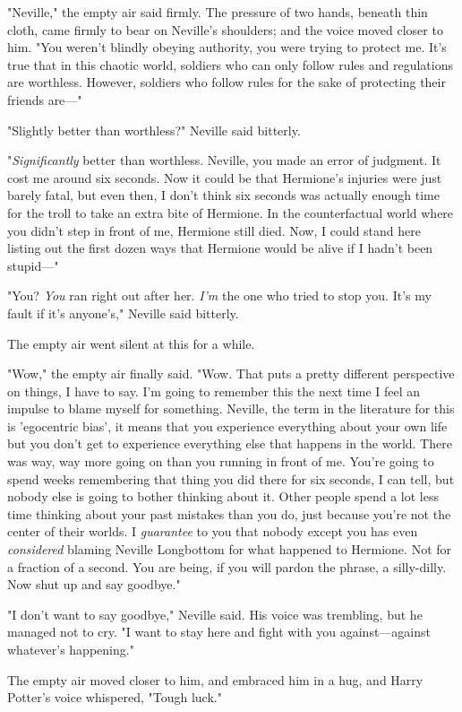 "Neville," the empty air said firmly. The pressure of two hands, beneath thin 
cloth, came firmly to bear on Neville's shoulders; and the voice moved closer 
to him. "You weren't blindly obeying authority, you were trying to protect me. 
It's true that in this chaotic world, soldiers who can only follow rules and 
regulations are worthless. However, soldiers who follow rules for the sake of 
protecting their friends are---"

"Slightly better than worthless?" Neville said bitterly.

"\emph{Significantly} better than worthless. Neville, you made an error of 
judgment. It cost me around six seconds. Now it could be that Hermione's 
injuries were just barely fatal, but even then, I don't think six seconds was 
actually enough time for the troll to take an extra bite of Hermione. In the 
counterfactual world where you didn't step in front of me, Hermione still died. 
Now, I could stand here listing out the first dozen ways that Hermione would be 
alive if I hadn't been stupid---"

"You? \emph{You} ran right out after her. \emph{I'm} the one who tried to stop 
you. It's my fault if it's anyone's," Neville said bitterly.

The empty air went silent at this for a while.

"Wow," the empty air finally said. "Wow. That puts a pretty different 
perspective on things, I have to say. I'm going to remember this the next time 
I feel an impulse to blame myself for something. Neville, the term in the 
literature for this is 'egocentric bias', it means that you experience 
everything about your own life but you don't get to experience everything else 
that happens in the world. There was way, way more going on than you running in 
front of me. You're going to spend weeks remembering that thing you did there 
for six seconds, I can tell, but nobody else is going to bother thinking about 
it. Other people spend a lot less time thinking about your past mistakes than 
you do, just because you're not the center of their worlds. I \emph{guarantee} 
to you that nobody except you has even \emph{considered} blaming Neville 
Longbottom for what happened to Hermione. Not for a fraction of a second. You 
are being, if you will pardon the phrase, a silly-dilly. Now shut up and say 
goodbye."

"I don't want to say goodbye," Neville said. His voice was trembling, but he 
managed not to cry. "I want to stay here and fight with you against---against 
whatever's happening."

The empty air moved closer to him, and embraced him in a hug, and Harry 
Potter's voice whispered, "Tough luck."
